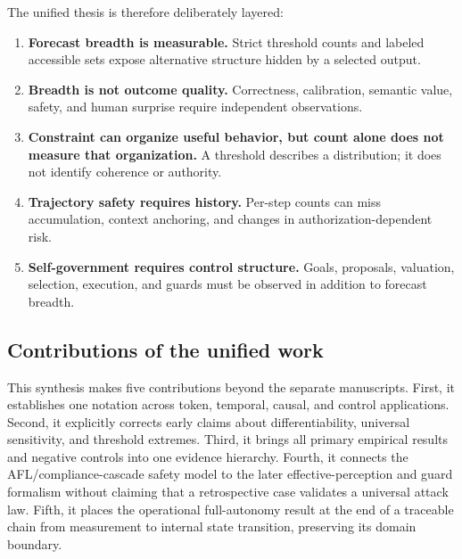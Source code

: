 The unified thesis is therefore deliberately layered:
\begin{enumerate}
  \item \textbf{Forecast breadth is measurable.} Strict threshold counts and labeled accessible sets expose alternative structure hidden by a selected output.
  \item \textbf{Breadth is not outcome quality.} Correctness, calibration, semantic value, safety, and human surprise require independent observations.
  \item \textbf{Constraint can organize useful behavior, but count alone does not measure that organization.} A threshold describes a distribution; it does not identify coherence or authority.
  \item \textbf{Trajectory safety requires history.} Per-step counts can miss accumulation, context anchoring, and changes in authorization-dependent risk.
  \item \textbf{Self-government requires control structure.} Goals, proposals, valuation, selection, execution, and guards must be observed in addition to forecast breadth.
\end{enumerate}

\subsection{Contributions of the unified work}
This synthesis makes five contributions beyond the separate manuscripts. First, it establishes one notation across token, temporal, causal, and control applications. Second, it explicitly corrects early claims about differentiability, universal sensitivity, and threshold extremes. Third, it brings all primary empirical results and negative controls into one evidence hierarchy. Fourth, it connects the AFL/compliance-cascade safety model to the later effective-perception and guard formalism without claiming that a retrospective case validates a universal attack law. Fifth, it places the operational full-autonomy result at the end of a traceable chain from measurement to internal state transition, preserving its domain boundary.

